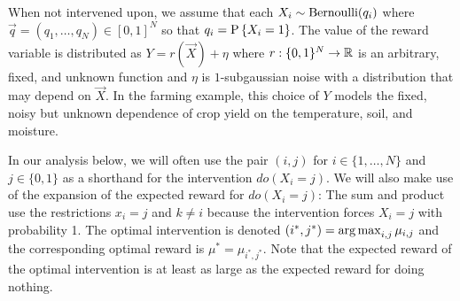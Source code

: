 When not intervened upon, we assume that each $X_i \sim \bernoulli(q_i)$ where $\vec{q} = (q_1, \ldots, q_N) \in [0,1]^N$ so that $q_i = \P{X_i = 1}$.
The value of the reward variable is distributed as $Y = r(\vec{X}) + \eta$ where $r : \{0,1\}^N \to \R$ is an arbitrary, fixed, and unknown function and $\eta$ is $1$-subgaussian noise with a distribution that may depend on $\vec{X}$.
In the farming example, this choice of $Y$ models the fixed, noisy but unknown dependence of crop yield on the temperature, soil, and moisture.


In our analysis below, we will often use the pair $(i,j)$ for $i \in \{1, \ldots, N\}$ and $j \in \{0,1\}$ as a shorthand for the intervention $do(X_i = j)$.
We will also make use of the expansion of the expected reward for $do(X_i = j)$:
The sum and product use the restrictions $x_i = j$ and $k \ne i$ because the intervention forces $X_i = j$ with probability 1.
The optimal intervention is denoted $(i^*,j^*) = \argmax_{i,j} \mu_{i,j}$ and the corresponding optimal reward is $\mu^* = \mu_{i^*,j^*}$. 
Note that the expected reward of the optimal intervention is at least as large as the expected reward for doing nothing.



